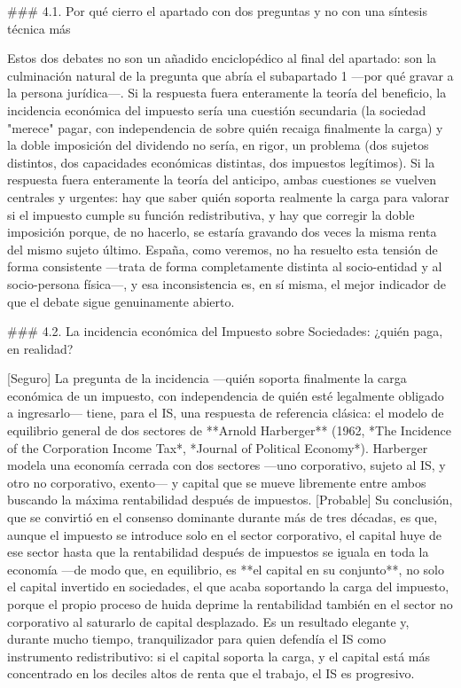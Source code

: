 \documentclass[10pt,a4paper]{article}
\begin{document}
### 4.1. Por qué cierro el apartado con dos preguntas y no con una síntesis técnica más

Estos dos debates no son un añadido enciclopédico al final del apartado: son la culminación natural de la pregunta que abría el subapartado 1 —por qué gravar a la persona jurídica—. Si la respuesta fuera enteramente la teoría del beneficio, la incidencia económica del impuesto sería una cuestión secundaria (la sociedad "merece" pagar, con independencia de sobre quién recaiga finalmente la carga) y la doble imposición del dividendo no sería, en rigor, un problema (dos sujetos distintos, dos capacidades económicas distintas, dos impuestos legítimos). Si la respuesta fuera enteramente la teoría del anticipo, ambas cuestiones se vuelven centrales y urgentes: hay que saber quién soporta realmente la carga para valorar si el impuesto cumple su función redistributiva, y hay que corregir la doble imposición porque, de no hacerlo, se estaría gravando dos veces la misma renta del mismo sujeto último. España, como veremos, no ha resuelto esta tensión de forma consistente —trata de forma completamente distinta al socio-entidad y al socio-persona física—, y esa inconsistencia es, en sí misma, el mejor indicador de que el debate sigue genuinamente abierto.

### 4.2. La incidencia económica del Impuesto sobre Sociedades: ¿quién paga, en realidad?

[Seguro] La pregunta de la incidencia —quién soporta finalmente la carga económica de un impuesto, con independencia de quién esté legalmente obligado a ingresarlo— tiene, para el IS, una respuesta de referencia clásica: el modelo de equilibrio general de dos sectores de **Arnold Harberger** (1962, *The Incidence of the Corporation Income Tax*, *Journal of Political Economy*). Harberger modela una economía cerrada con dos sectores —uno corporativo, sujeto al IS, y otro no corporativo, exento— y capital que se mueve libremente entre ambos buscando la máxima rentabilidad después de impuestos. [Probable] Su conclusión, que se convirtió en el consenso dominante durante más de tres décadas, es que, aunque el impuesto se introduce solo en el sector corporativo, el capital huye de ese sector hasta que la rentabilidad después de impuestos se iguala en toda la economía —de modo que, en equilibrio, es **el capital en su conjunto**, no solo el capital invertido en sociedades, el que acaba soportando la carga del impuesto, porque el propio proceso de huida deprime la rentabilidad también en el sector no corporativo al saturarlo de capital desplazado. Es un resultado elegante y, durante mucho tiempo, tranquilizador para quien defendía el IS como instrumento redistributivo: si el capital soporta la carga, y el capital está más concentrado en los deciles altos de renta que el trabajo, el IS es progresivo.
\end{document}
